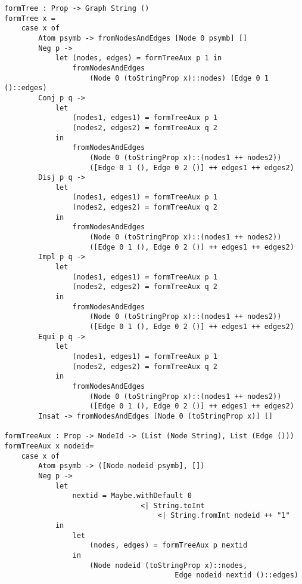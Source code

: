 \documentclass[a4paper]{report}
\begin{document}
\begin{lstlisting}[caption= Definición de la función formTree]
formTree : Prop -> Graph String ()
formTree x =
    case x of
        Atom psymb -> fromNodesAndEdges [Node 0 psymb] []
        Neg p -> 
            let (nodes, edges) = formTreeAux p 1 in
                fromNodesAndEdges 
                    (Node 0 (toStringProp x)::nodes) (Edge 0 1 ()::edges)
        Conj p q -> 
            let 
                (nodes1, edges1) = formTreeAux p 1
                (nodes2, edges2) = formTreeAux q 2
            in
                fromNodesAndEdges 
                    (Node 0 (toStringProp x)::(nodes1 ++ nodes2)) 
                    ([Edge 0 1 (), Edge 0 2 ()] ++ edges1 ++ edges2)
        Disj p q -> 
            let 
                (nodes1, edges1) = formTreeAux p 1
                (nodes2, edges2) = formTreeAux q 2
            in
                fromNodesAndEdges 
                    (Node 0 (toStringProp x)::(nodes1 ++ nodes2)) 
                    ([Edge 0 1 (), Edge 0 2 ()] ++ edges1 ++ edges2)
        Impl p q -> 
            let 
                (nodes1, edges1) = formTreeAux p 1
                (nodes2, edges2) = formTreeAux q 2
            in
                fromNodesAndEdges 
                    (Node 0 (toStringProp x)::(nodes1 ++ nodes2)) 
                    ([Edge 0 1 (), Edge 0 2 ()] ++ edges1 ++ edges2)
        Equi p q -> 
            let 
                (nodes1, edges1) = formTreeAux p 1
                (nodes2, edges2) = formTreeAux q 2
            in
                fromNodesAndEdges 
                    (Node 0 (toStringProp x)::(nodes1 ++ nodes2)) 
                    ([Edge 0 1 (), Edge 0 2 ()] ++ edges1 ++ edges2)
        Insat -> fromNodesAndEdges [Node 0 (toStringProp x)] []

formTreeAux : Prop -> NodeId -> (List (Node String), List (Edge ()))
formTreeAux x nodeid=
    case x of
        Atom psymb -> ([Node nodeid psymb], [])
        Neg p -> 
            let 
                nextid = Maybe.withDefault 0 
                                <| String.toInt 
                                    <| String.fromInt nodeid ++ "1" 
            in
                let 
                    (nodes, edges) = formTreeAux p nextid 
                in
                    (Node nodeid (toStringProp x)::nodes, 
                                        Edge nodeid nextid ()::edges)
                                        
                                        
                                        

\end{lstlisting}
\end{document}
